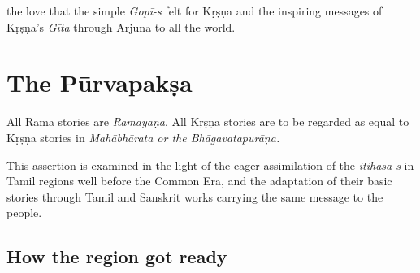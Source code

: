 the love that the simple \textit{Gopī-s} felt for Kṛṣṇa and the inspiring messages of Kṛṣṇa’s \textit{Gīta} through Arjuna to all the world.


\section*{The Pūrvapakṣa}

All Rāma stories are \textit{Rāmāyaṇa}. All Kṛṣṇa stories are to be regarded as equal to Kṛṣṇa stories in \textit{Mahābhārata or the Bhāgavatapurāṇa.}

This assertion is examined in the light of the eager assimilation of the \textit{itihāsa-s} in Tamil regions well before the Common Era, and the adaptation of their basic stories through Tamil and Sanskrit works carrying the same message to the people.

\subsection*{How the region got ready}

